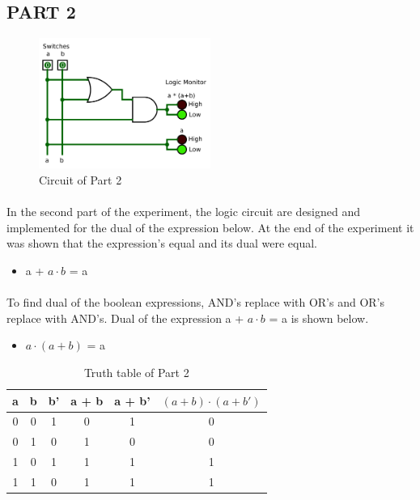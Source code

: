 \documentclass[pdftex,12pt,a4paper]{article}
\begin{document}
\begin{flushleft}
\subsection{PART 2}


\begin{figure}[!h]
	\centering
	\includegraphics[width=0.5\textwidth]{part2.png}	
	\caption{Circuit of Part 2}
	\label{fig1}
\end{figure}

\paragraph{}
In the second part of the experiment, the logic circuit are designed and implemented for the dual of the expression below. At the end of the experiment it was shown that the expression's equal and its dual were equal. 

\begin{itemize}
    \item a + $a \cdot b$ = a
\end{itemize}

\paragraph{}
To find dual of the boolean expressions, AND's replace with OR's and OR's replace with AND's. Dual of the expression a + $a \cdot b$ = a is  shown below. 

\begin{itemize}
    \item $a \cdot (a + b)$ = a
\end{itemize}


\begin{table}[h]
    \centering
    \begin{tabular}{|c|c|c|c|c|c|}
    \hline
    a & b & b' & a + b & a + b' & $(a + b) \cdot (a + b')$ \\ \hline
    0 & 0 & 1  & 0     & 1      & 0                  \\
    0 & 1 & 0  & 1     & 0      & 0                  \\
    1 & 0 & 1  & 1     & 1      & 1                  \\
    1 & 1 & 0  & 1     & 1      & 1                  \\ \hline
    \end{tabular}
    \caption{Truth table of Part 2}
    \label{fig2}
\end{table}


\end{flushleft}
\end{document}
